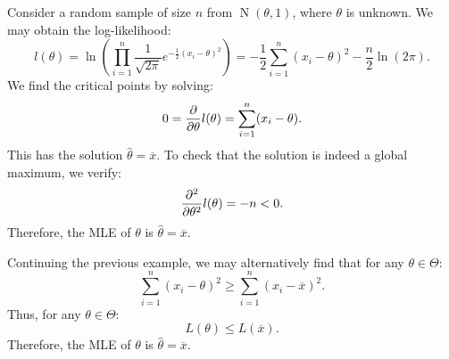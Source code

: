 \documentclass{huhtakm-template-book-v2}
\DeclareMathOperator{\N}{N}
\begin{document}
    \begin{eg}
        Consider a random sample of size $n$ from $\N(\theta, 1)$, where $\theta$ is unknown. We may obtain the log-likelihood:
        \begin{equation*}
            l(\theta) = \ln\left(\prod_{i=1}^{n} \frac{1}{\sqrt{2\pi}} e^{-\frac{1}{2}(x_{i} - \theta)^{2}}\right) = -\frac{1}{2} \sum_{i=1}^{n} (x_{i} - \theta)^{2} - \frac{n}{2} \ln(2\pi).
        \end{equation*}
        We find the critical points by solving:
        \begin{equation*}
            0 = \pdv*{l(\theta)}{\theta} = \sum_{i=1}^{n} (x_{i} - \theta).
        \end{equation*}
        This has the solution $\hat{\theta} = \overline{x}$. To check that the solution is indeed a global maximum, we verify:
        \begin{equation*}
            \pdv*[order={2}]{l(\theta)}{\theta} = -n < 0.
        \end{equation*}
        Therefore, the MLE of $\theta$ is $\hat{\theta} = \overline{x}$.
    \end{eg}
    \begin{eg}
        Continuing the previous example, we may alternatively find that for any $\theta \in \Theta$:
        \begin{equation*}
            \sum_{i=1}^{n} (x_{i} - \theta)^{2} \geq \sum_{i=1}^{n} (x_{i} - \overline{x})^{2}.
        \end{equation*}
        Thus, for any $\theta \in \Theta$:
        \begin{equation*}
            L(\theta) \leq L(\overline{x}).
        \end{equation*}
        Therefore, the MLE of $\theta$ is $\hat{\theta} = \overline{x}$.
    \end{eg}
\end{document}
